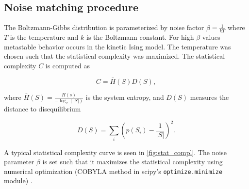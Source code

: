 \documentclass[a4paper, 11pt, twocolumn]{article}
\begin{document}
\subsection{Noise matching procedure}
\label{sec:org11ee4e3}
The Boltzmann-Gibbs distribution is parameterized by noise factor
\(\beta =  \frac{1}{kT}\) where \(T\) is the temperature and \(k\) is
the Boltzmann constant. For high \(\beta\) values metastable behavior
occurs in the kinetic Ising model. The temperature was chosen such that
the statistical complexity \cite{Lopez-Ruiz1995a} was maximized. The
statistical complexity \(C\) is computed as

\[C = \bar H(S) D(S),\]

where \(\bar H(S) = \frac{H(s)}{-\log_2(|S|)}\) is the system entropy,
and \(D(S)\) measures the distance to disequilibrium

\[D(S) = \sum_i (p(S_i) - \frac{1}{|S|})^2.\]

A typical statistical complexity curve is seen in
\cref{fig:stat_compl}. The noise parameter \(\beta\) is set such that
it maximizes the statistical complexity using numerical optimization
(COBYLA method in scipy's \texttt{optimize.minimize} module)
\cite{Virtanen2020}.
\end{document}
